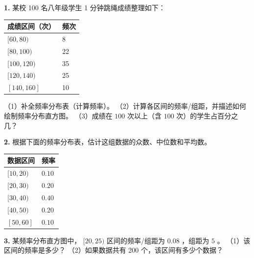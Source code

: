 \begin{practice}


\textbf{1.} 某校 100 名八年级学生 1 分钟跳绳成绩整理如下：

\begin{center}
\begin{tabular}{ll}
\toprule
成绩区间（次） & 频次 \\
\midrule
$[60, 80)$ & 8 \\
$[80, 100)$ & 22 \\
$[100, 120)$ & 35 \\
$[120, 140)$ & 25 \\
$[140, 160]$ & 10 \\
\bottomrule
\end{tabular}
\end{center}


（1）补全频率分布表（计算频率）。
（2）计算各区间的频率/组距，并描述如何绘制频率分布直方图。
（3）成绩在 $100$ 次以上（含 $100$ 次）的学生占百分之几？

\textbf{2.} 根据下面的频率分布表，估计这组数据的众数、中位数和平均数。

\begin{center}
\begin{tabular}{ll}
\toprule
数据区间 & 频率 \\
\midrule
$[10, 20)$ & $0.10$ \\
$[20, 30)$ & $0.20$ \\
$[30, 40)$ & $0.40$ \\
$[40, 50)$ & $0.20$ \\
$[50, 60]$ & $0.10$ \\
\bottomrule
\end{tabular}
\end{center}


\textbf{3.} 某频率分布直方图中， $[20, 25)$ 区间的频率/组距为 $0.08$ ，组距为 $5$ 。
（1）该区间的频率是多少？
（2）如果数据共有 200 个，该区间有多少个数据？

\end{practice}




